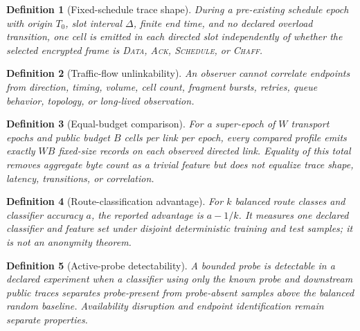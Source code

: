\documentclass[11pt,oneside]{article}
\newtheorem{definition}{Definition}
\begin{document}
\begin{definition}[Fixed-schedule trace shape]
During a pre-existing schedule epoch with origin $T_0$, slot interval $\Delta$, finite end time, and no declared overload transition, one cell is emitted in each directed slot independently of whether the selected encrypted frame is \textsc{Data}, \textsc{Ack}, \textsc{Schedule}, or \textsc{Chaff}.
\end{definition}

\begin{definition}[Traffic-flow unlinkability]
An observer cannot correlate endpoints from direction, timing, volume, cell count, fragment bursts, retries, queue behavior, topology, or long-lived observation.
\end{definition}


\begin{definition}[Equal-budget comparison]
For a super-epoch of $W$ transport epochs and public budget $B$ cells per link per epoch, every compared profile emits exactly $WB$ fixed-size records on each observed directed link. Equality of this total removes aggregate byte count as a trivial feature but does not equalize trace shape, latency, transitions, or correlation.
\end{definition}

\begin{definition}[Route-classification advantage]
For $k$ balanced route classes and classifier accuracy $a$, the reported advantage is $a-1/k$. It measures one declared classifier and feature set under disjoint deterministic training and test samples; it is not an anonymity theorem.
\end{definition}

\begin{definition}[Active-probe detectability]
A bounded probe is detectable in a declared experiment when a classifier using only the known probe and downstream public traces separates probe-present from probe-absent samples above the balanced random baseline. Availability disruption and endpoint identification remain separate properties.
\end{definition}
\end{document}
